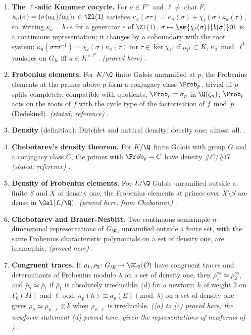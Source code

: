 \begin{enumerate}[label=\textbf{\thechapter.\arabic*}]
\emph{(proved here)} .
\item \textbf{The $\ell$-adic Kummer cocycle.} For $a\in F^\times$ and $\ell\ne\operatorname{char}F$, $\kappa_a(\sigma)=(\sigma(\alpha_k)/\alpha_k)_k\in\Zl(1)$
satisfies $\kappa_a(\sigma\tau)=\kappa_a(\sigma)+\chi_\ell(\sigma)\kappa_a(\tau)$, so, writing $\kappa_a=b\cdot e$ for a generator $e$ of $\Zl(1)$, $\sigma\mapsto\sm{\chi_\ell(\sigma)}{b(\sigma)}01$ is a continuous
representation; it changes by a coboundary with the root system; $\kappa_a(\sigma\tau\sigma^{-1})=\chi_\ell(\sigma)\kappa_a(\tau)$ for $\tau\in\ker\chi_\ell$;
if $\mu_{\ell^k}\subset K$, $\kappa_a\bmod\ell^k$ vanishes on $G_K$ iff $a\in K^{\times\ell^k}$. \emph{(proved here)} .
\item \textbf{Frobenius elements.} For $K/\Q$ finite Galois unramified at $p$, the Frobenius elements at the primes above $p$ form a conjugacy class
$\Frob_p$, trivial iff $p$ splits completely, compatible with quotients; $\Frob_p=\sigma_p$ in $\Q(\zeta_n)$; $\Frob_p$ acts on the roots of $f$ with the
cycle type of the factorisation of $f\bmod p$ (Dedekind). \emph{(stated; reference)} .
\item \textbf{Density} (definition). Dirichlet and natural density; density one; almost all. .
\item \textbf{Chebotarev's density theorem.} For $K/\Q$ finite Galois with group $G$ and a conjugacy class $C$, the primes with $\Frob_p=C$ have density
$\#C/\#G$. \emph{(stated; reference)} .
\item \textbf{Density of Frobenius elements.} For $L/\Q$ Galois unramified outside a finite $S$ and $X$ of density one, the Frobenius elements at primes
over $X\setminus S$ are dense in $\Gal(L/\Q)$. \emph{(proved here, from Chebotarev)} .
\item \textbf{Chebotarev and Brauer-Nesbitt.} Two continuous semisimple $n$-dimensional representations of $G_\Q$, unramified outside a finite set, with the
same Frobenius characteristic polynomials on a set of density one, are isomorphic. \emph{(proved here)} .
\item \textbf{Congruent traces.} If $\rho_1,\rho_2\colon G_\Q\to\GL_2(\mathcal{O})$ have congruent traces and determinants of Frobenius modulo $\lambda$ on a
set of density one, then $\bar\rho_1^{ss}\simeq\bar\rho_2^{ss}$, and $\bar\rho_2\simeq\bar\rho_1$ if $\bar\rho_1$ is absolutely irreducible; (d) for a newform $h$
of weight $2$ on $\Gamma_0(M)$ and $\ell$ odd, $a_p(h)\equiv a_p(E)\pmod\lambda$ on a set of density one gives $\bar\rho_h\simeq\bar\rho_{E,\ell}\otimes k$ when $\bar\rho_{E,\ell}$ is irreducible.
\emph{((a) to (c) proved here; the newform statement (d) proved here, given the representations of newforms of )}
.
\end{enumerate}

